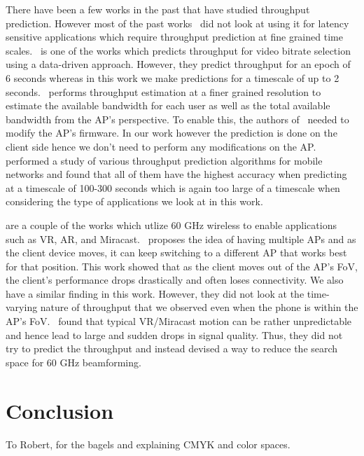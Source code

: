 \documentclass[sigconf,anonymous]{acmart}
\begin{document}
There have been a few works in the past that have studied throughput prediction. However most of the past works~\cite{mirza:sigmetrics2007, bui:ewc2014, liu:globecom2015} did not look at using it for latency sensitive applications which require throughput prediction at fine grained time scales.~\cite{sun:sigcomm2016} is one of the works which predicts throughput for video bitrate selection using a data-driven approach. However, they predict throughput for an epoch of 6 seconds whereas in this work we make predictions for a timescale of up to 2 seconds.~\cite{liu:atc2020} performs throughput estimation at a finer grained resolution to estimate the available bandwidth for each user as well as the total available bandwidth from the AP's perspective. To enable this, the authors of~\cite{liu:atc2020} needed to modify the AP's firmware. In our work however the prediction is done on the client side hence we don't need to perform any modifications on the AP.~\cite{liu:globecom2015} performed a study of various throughput prediction algorithms for mobile networks and found that all of them have the highest accuracy when predicting at a timescale of 100-300 seconds which is again too large of a timescale when considering the type of applications we look at in this work.

\cite{wei:mobicom2017,zhou:infocom2018} are a couple of the works which utlize 60 GHz wireless to enable applications such as VR, AR, and Miracast.~\cite{wei:mobicom2017} proposes the idea of having multiple APs and as the client device moves, it can keep switching to a different AP that works best for that position. This work showed that as the client moves out of the AP's FoV, the client's performance drops drastically and often loses connectivity. We also have a similar finding in this work. However, they did not look at the time-varying nature of throughput that we observed even when the phone is within the AP's FoV.~\cite{zhou:infocom2018} found that typical VR/Miracast motion can be rather unpredictable and hence lead to large and sudden drops in signal quality. Thus, they did not try to predict the throughput and instead devised a way to reduce the search space for 60 GHz beamforming.

\section{Conclusion}



\begin{acks}
To Robert, for the bagels and explaining CMYK and color spaces.
\end{acks}
\end{document}
